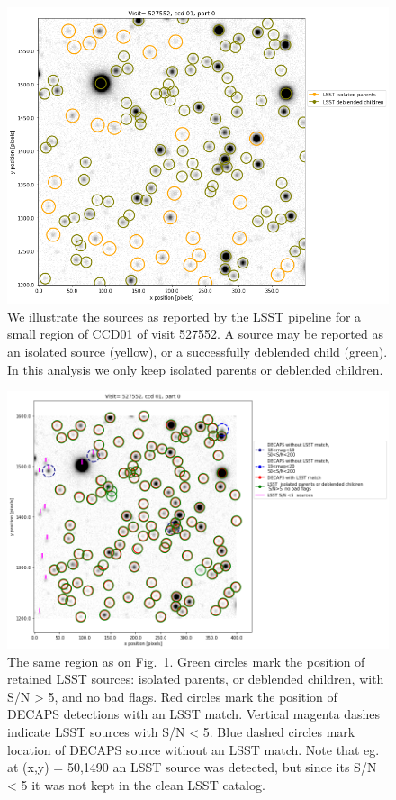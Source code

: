 \documentclass[DM,lsstdraft,toc,usenatbib,authoryear]{lsstdoc}
\begin{document}
\begin{figure}
\begin{centering}
\includegraphics[width=1.0\columnwidth]{figs/visit_527552_ccd_1.png}
\vskip -0.15in
\caption{We illustrate the sources as reported by the LSST pipeline for a small region of CCD01 of visit 527552. A source may be reported as an isolated source (yellow),  or a successfully deblended child (green). In this analysis we only keep isolated parents or deblended children.}
\label{fig:lsst_sources}
\end{centering}
\end{figure}


\begin{figure}
\begin{centering}
\includegraphics[width=1.1\columnwidth]{figs/visit_527552_ccd_1_lowSN.png}
\caption{The same region as on Fig.~\ref{fig:lsst_sources}. Green circles mark the position of retained LSST sources: isolated parents, or deblended children, with  S/N > 5, and no bad flags. Red circles mark the position of DECAPS detections with an LSST match. Vertical magenta dashes indicate LSST sources with S/N < 5.   Blue dashed circles mark location of DECAPS source without an LSST match. Note that eg. at (x,y) = 50,1490  an LSST source was detected, but since its  S/N < 5 it was not kept in the clean LSST catalog.   }
\label{fig:lsst_decaps_sources}
\end{centering}
\end{figure}
\end{document}
